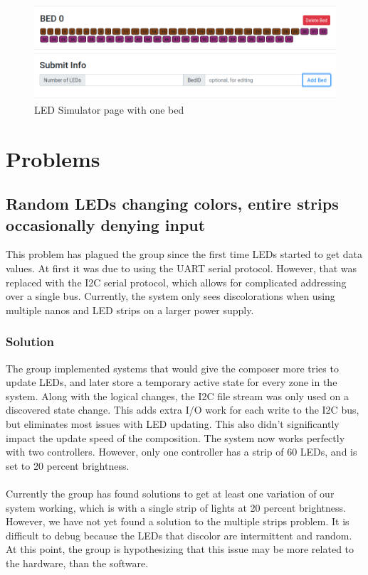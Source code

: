\documentclass[onecolumn, draftclsnofoot,10pt, compsoc]{IEEEtran}
\begin{document}
		\begin{center}
			\begin{figure}[H]
				\includegraphics[width=\linewidth]{site/simulator.png}
				\caption{LED Simulator page with one bed}
				\label{fig:siteSimulator}
			\end{figure}
		\end{center}


	\section{Problems}
		\subsection{Random LEDs changing colors, entire strips occasionally denying input}
			This problem has plagued the group since the first time LEDs started to get data values.
			At first it was due to using the UART serial protocol. However, that was replaced with the I2C serial protocol, which allows for complicated 
			addressing over a single bus. Currently, the system only sees discolorations when using multiple nanos and LED strips on a larger power supply. 

			\subsubsection{Solution}
				The group implemented systems that would give the composer more tries to update LEDs, and later store a temporary active state for every zone 
				in the system. Along with the logical changes, the I2C file stream was only used on a discovered state change. This adds extra I/O work for 
				each write to the I2C bus, but eliminates most issues with LED updating. This also didn't significantly impact the update speed of the 
				composition. The system now works perfectly with two controllers. However, only one controller has a strip of 60 LEDs, and is set to 20 
				percent brightness. 
				\\\\
				Currently the group has found solutions to get at least one variation of our system working, which is with a single strip of lights at 20 
				percent brightness. However, we have not yet found a solution to the multiple strips problem. It is difficult to debug because the LEDs that 
				discolor are intermittent and random. At this point, the group is hypothesizing that this issue may be more related to the hardware, than 
				the software.
\end{document}
